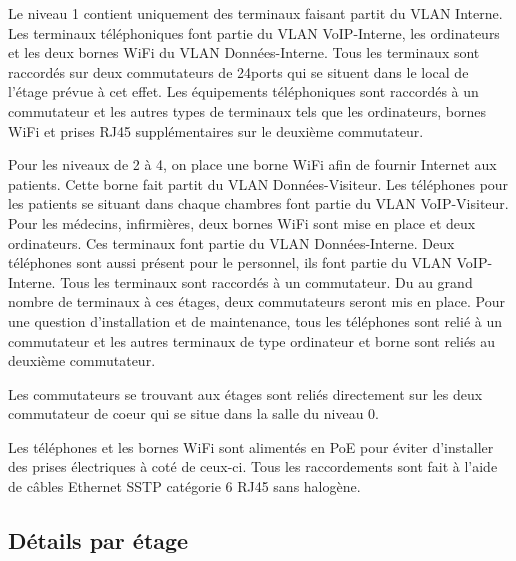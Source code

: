Le niveau 1 contient uniquement des terminaux faisant partit du VLAN Interne. Les terminaux téléphoniques font partie du VLAN VoIP-Interne, les ordinateurs et les deux bornes WiFi du VLAN Données-Interne. Tous les terminaux sont raccordés sur deux commutateurs de 24ports qui se situent dans le local de l'étage prévue à cet effet. Les équipements téléphoniques sont raccordés à un commutateur et les autres types de terminaux tels que les ordinateurs, bornes WiFi et prises RJ45 supplémentaires sur le deuxième commutateur.


Pour les niveaux de 2 à 4, on place une borne WiFi afin de fournir Internet aux patients. Cette borne fait partit du VLAN Données-Visiteur. Les téléphones pour les patients se situant dans chaque chambres font partie du VLAN VoIP-Visiteur.
Pour les médecins, infirmières, deux bornes WiFi sont mise en place et deux ordinateurs. Ces terminaux font partie du VLAN Données-Interne.
Deux téléphones sont aussi présent pour le personnel, ils font partie du VLAN VoIP-Interne.
Tous les terminaux sont raccordés à un commutateur. Du au grand nombre de terminaux à ces étages, deux commutateurs seront mis en place. Pour une question d'installation et de maintenance, tous les téléphones sont relié à un commutateur et les autres terminaux de type ordinateur et borne sont reliés au deuxième commutateur.

Les commutateurs se trouvant aux étages sont reliés directement sur les  deux commutateur de coeur qui se situe dans la salle du niveau 0.

Les téléphones et les bornes WiFi sont alimentés en PoE pour éviter d'installer des prises électriques à coté de ceux-ci.
Tous les raccordements sont fait à l'aide de câbles Ethernet SSTP catégorie 6 RJ45 sans halogène.


%
%
\subsection{Détails par étage}

